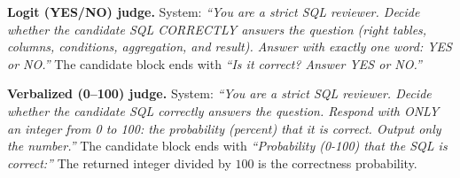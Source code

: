 \documentclass[11pt]{article}
\begin{document}
\noindent\textbf{Logit (YES/NO) judge.} System: \textit{``You are a strict SQL reviewer. Decide
whether the candidate SQL CORRECTLY answers the question (right tables, columns, conditions,
aggregation, and result). Answer with exactly one word: YES or NO.''} The candidate block ends with
\textit{``Is it correct? Answer YES or NO.''}

\noindent\textbf{Verbalized (0--100) judge.} System: \textit{``You are a strict SQL reviewer. Decide
whether the candidate SQL correctly answers the question. Respond with ONLY an integer from 0 to 100:
the probability (percent) that it is correct. Output only the number.''} The candidate block ends with
\textit{``Probability (0-100) that the SQL is correct:''} The returned integer divided by $100$ is the
correctness probability.



\end{document}
